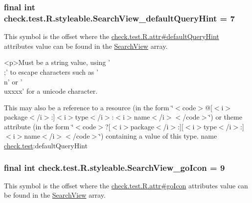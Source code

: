 \subsubsection[{Search\+View\+\_\+default\+Query\+Hint}]{\setlength{\rightskip}{0pt plus 5cm}final int check.\+test.\+R.\+styleable.\+Search\+View\+\_\+default\+Query\+Hint = 7\hspace{0.3cm}{\ttfamily [static]}}\label{classcheck_1_1test_1_1_r_1_1styleable_a25fc4426b5d6f7fd9c05b2c7b543a9c7}
This symbol is the offset where the \hyperlink{classcheck_1_1test_1_1_r_1_1attr_a3f57a68c10afd741f6c53c31355e1052}{check.\+test.\+R.\+attr\#default\+Query\+Hint} attribute\textquotesingle{}s value can be found in the \hyperlink{classcheck_1_1test_1_1_r_1_1styleable_af133609668e9a4263b21387e9a7574f8}{Search\+View} array.

\begin{DoxyVerb}      <p>Must be a string value, using '\\;' to escape characters such as '\\n' or '\\uxxxx' for a unicode character.
\end{DoxyVerb}
 

This may also be a reference to a resource (in the form \char`\"{}$<$code$>$@\mbox{[}$<$i$>$package$<$/i$>$\+:\mbox{]}$<$i$>$type$<$/i$>$\+:$<$i$>$name$<$/i$>$$<$/code$>$\char`\"{}) or theme attribute (in the form \char`\"{}$<$code$>$?\mbox{[}$<$i$>$package$<$/i$>$\+:\mbox{]}\mbox{[}$<$i$>$type$<$/i$>$\+:\mbox{]}$<$i$>$name$<$/i$>$$<$/code$>$\char`\"{}) containing a value of this type.  name \hyperlink{namespacecheck_1_1test}{check.\+test}\+:default\+Query\+Hint \hypertarget{classcheck_1_1test_1_1_r_1_1styleable_aa1834df2b3dd894df7c2d6e194cf864a}{}
\subsubsection[{Search\+View\+\_\+go\+Icon}]{\setlength{\rightskip}{0pt plus 5cm}final int check.\+test.\+R.\+styleable.\+Search\+View\+\_\+go\+Icon = 9\hspace{0.3cm}{\ttfamily [static]}}\label{classcheck_1_1test_1_1_r_1_1styleable_aa1834df2b3dd894df7c2d6e194cf864a}
This symbol is the offset where the \hyperlink{classcheck_1_1test_1_1_r_1_1attr_aeed41eb5bc4a4ba79928aa878a07a01c}{check.\+test.\+R.\+attr\#go\+Icon} attribute\textquotesingle{}s value can be found in the \hyperlink{classcheck_1_1test_1_1_r_1_1styleable_af133609668e9a4263b21387e9a7574f8}{Search\+View} array.

